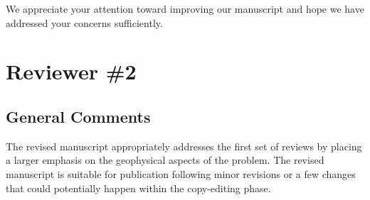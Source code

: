 \documentclass[11pt]{article}
\begin{document}
We appreciate your attention toward improving our manuscript and hope we have addressed your concerns sufficiently. 

\section*{Reviewer \#2}

\subsection*{General Comments}

The revised manuscript appropriately addresses the first set of reviews by placing a larger emphasis on the geophysical aspects of the problem. The revised manuscript is suitable for publication following minor revisions or a few changes that could potentially happen within the copy-editing phase.
\end{document}
